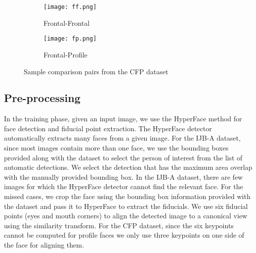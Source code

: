 \documentclass[10pt,twocolumn,letterpaper]{article}
\begin{document}
\begin{figure}
\centering
\begin{subfigure}{.25\textwidth}
  \centering
  \texttt{[image: ff.png]}
  \caption{Frontal-Frontal}
  \label{fig:sub1}
\end{subfigure}\begin{subfigure}{.25\textwidth}
  \centering
  \texttt{[image: fp.png]}
  \caption{Frontal-Profile}
  \label{fig:sub2}
\end{subfigure}
\caption{Sample comparison pairs from the CFP dataset}
\label{fig:cfp}
\end{figure}


\subsection{Pre-processing}
In the training phase, given an input image, we use the HyperFace method
\cite{hyperface} for face detection and fiducial point extraction. The HyperFace
detector automatically extracts many faces from a given image. For the IJB-A dataset, since most images contain more than one face, we use the bounding boxes provided along with
the dataset to select the person of interest from the list of automatic
detections. We select the detection that has the maximum area overlap with the
manually provided bounding box. In the IJB-A dataset, there are few images for
which the HyperFace detector cannot find the relevant face. For the missed
cases, we crop the face using the bounding box information provided with the
dataset and pass it to HyperFace to extract the fiducials. We use six fiducial
points (eyes and mouth corners) to align the detected image to a canonical view
using the similarity transform. For the CFP dataset, since the six keypoints cannot
be computed for profile faces we only use three keypoints on one side of the
face for aligning them.
\end{document}
